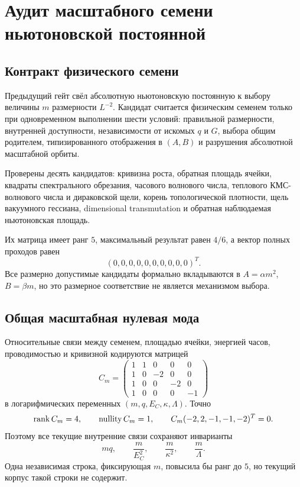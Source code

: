 \chapter{Аудит масштабного семени ньютоновской постоянной}
\label{ch:v10-induced-newton-scale-seed-audit}

\section{Контракт физического семени}

Предыдущий гейт свёл абсолютную ньютоновскую постоянную к выбору величины
$m$ размерности $L^{-2}$. Кандидат считается физическим семенем только при
одновременном выполнении шести условий: правильной размерности, внутренней
доступности, независимости от искомых $q$ и $G$, выбора общим родителем,
типизированного отображения в $(A,B)$ и разрушения абсолютной масштабной
орбиты.

Проверены десять кандидатов: кривизна роста, обратная площадь ячейки,
квадраты спектрального обрезания, часового волнового числа, теплового
КМС-волнового числа и дираковской щели, корень топологической плотности,
щель вакуумного гессиана, dimensional transmutation и обратная наблюдаемая
ньютоновская площадь.

Их матрица имеет ранг $5$, максимальный результат равен $4/6$, а вектор
полных проходов равен
\begin{equation}
 (0,0,0,0,0,0,0,0,0,0)^T.
 \label{eq:v10-newton-seed-pass-vector}
\end{equation}
Все размерно допустимые кандидаты формально вкладываются в
$A=\alpha m^2$, $B=\beta m$, но это размерное соответствие не является
механизмом выбора.

\section{Общая масштабная нулевая мода}

Относительные связи между семенем, площадью ячейки, энергией часов,
проводимостью и кривизной кодируются матрицей
\begin{equation}
 C_m=
 \begin{pmatrix}
 1&1&0&0&0\\
 1&0&-2&0&0\\
 1&0&0&-2&0\\
 1&0&0&0&-1
 \end{pmatrix}
 \label{eq:v10-newton-seed-relative-map}
\end{equation}
в логарифмических переменных $(m,q,E_C,\kappa,\Lambda)$. Точно
\begin{equation}
 \operatorname{rank} C_m=4,
 \qquad \operatorname{nullity}C_m=1,
 \qquad C_m(-2,2,-1,-1,-2)^T=0.
 \label{eq:v10-newton-seed-relative-rank}
\end{equation}
Поэтому все текущие внутренние связи сохраняют инварианты
\begin{equation}
 mq,\qquad \frac{m}{E_C^2},\qquad
 \frac{m}{\kappa^2},\qquad \frac{m}{\Lambda}.
 \label{eq:v10-newton-seed-invariants}
\end{equation}
Одна независимая строка, фиксирующая $m$, повысила бы ранг до $5$, но
текущий корпус такой строки не содержит.

